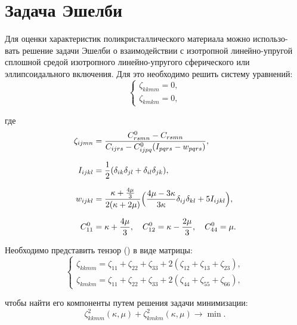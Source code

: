 \documentclass[12pt,a4paper]{article}
\begin{document}
 \section{Задача Эшелби}

 Для оценки характеристик поликристаллического материала можно использо-
вать решение задачи Эшелби о взаимодействии с изотропной линейно-упругой сплошной средой изотропного линейно-упругого сферического или эллипсоидального включения. Для это необходимо решить систему уравнений:
\begin{equation}
    \begin{cases}
        \zeta_{kkmm} = 0, \\
        \zeta_{kmkm} = 0,
    \end{cases}  
    \label{eq:zeta}
\end{equation}

\noindent где 
\begin{gather*}
    \begin{split}
        \zeta_{ijmn} &= \dfrac{C_{rsmn}^0 - C_{rsmn}}{C_{ijrs} - C_{ijpq}^0 (I_{pqrs} - w_{pqrs})}, \\[0.7em]
        I_{ijkl} &= \dfrac{1}{2}(\delta_{ik} \delta_{jl} + \delta_{il} \delta_{jk}), \\[0.7em]
        w_{ijkl} &= \dfrac{\kappa + \frac{4 \mu}{3}}{2(\kappa + 2\mu)} \Bigl(\dfrac{4 \mu - 3\kappa}{3 \kappa} \delta_{ij} \delta_{kl} + 5 I_{ijkl} \Bigr), \\[0.7em]
        C^0_{11} &= \kappa + \dfrac{4 \mu}{3}, \quad C^0_{12} = \kappa - \dfrac{2\mu}{3}, \quad C^0_{44} = \mu.
    \end{split}
\end{gather*}

Необходимо представить тензор () в виде матрицы:
\[
    \begin{cases}
        \zeta_{kkmm} = \zeta_{11} + \zeta_{22} + \zeta_{33} + 2(\zeta_{12} + \zeta_{13} + \zeta_{23}), \\
        \zeta_{kmkm} = \zeta_{11} + \zeta_{22} + \zeta_{33} + 2(\zeta_{44} + \zeta_{55} + \zeta_{66}),
    \end{cases}  
\]

\noindent чтобы найти его компоненты путем решения задачи минимизации:
\begin{equation}
    \zeta^2_{kkmm}(\kappa, \mu) + \zeta^2_{kmkm}(\kappa, \mu) \rightarrow \min.
    \label{eq:min}    
\end{equation}

\pagebreak
\end{document}
